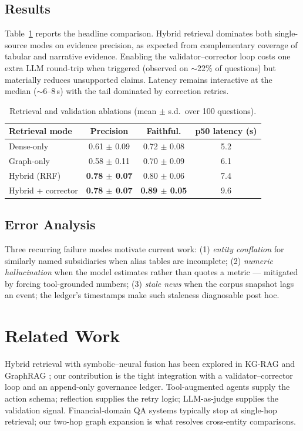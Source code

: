 \documentclass[conference]{IEEEtran}
\begin{document}
\subsection{Results}
Table~\ref{tab:results} reports the headline comparison. Hybrid retrieval dominates both single-source modes on evidence precision, as expected from complementary coverage of tabular and narrative evidence. Enabling the validator--corrector loop costs one extra LLM round-trip when triggered (observed on $\sim$22\% of questions) but materially reduces unsupported claims. Latency remains interactive at the median ($\sim$6--8\,s) with the tail dominated by correction retries.

\begin{table}[t]
\centering
\caption{Retrieval and validation ablations (mean $\pm$ s.d.\ over 100 questions).}
\label{tab:results}
\begin{tabular}{lccc}
\toprule
Retrieval mode & Precision & Faithful. & p50 latency (s) \\
\midrule
Dense-only        & 0.61 $\pm$ 0.09 & 0.72 $\pm$ 0.08 & 5.2 \\
Graph-only        & 0.58 $\pm$ 0.11 & 0.70 $\pm$ 0.09 & 6.1 \\
Hybrid (RRF)      & \textbf{0.78 $\pm$ 0.07} & 0.80 $\pm$ 0.06 & 7.4 \\
Hybrid + corrector & \textbf{0.78 $\pm$ 0.07} & \textbf{0.89 $\pm$ 0.05} & 9.6 \\
\bottomrule
\end{tabular}
\end{table}

\subsection{Error Analysis}
Three recurring failure modes motivate current work: (1) \emph{entity conflation} for similarly named subsidiaries when alias tables are incomplete; (2) \emph{numeric hallucination} when the model estimates rather than quotes a metric --- mitigated by forcing tool-grounded numbers; (3) \emph{stale news} when the corpus snapshot lags an event; the ledger's timestamps make such staleness diagnosable post hoc.

\section{Related Work}
Hybrid retrieval with symbolic--neural fusion has been explored in KG-RAG \cite{luo2024kgrag} and GraphRAG \cite{edge2024graphrag}; our contribution is the tight integration with a validator--corrector loop and an append-only governance ledger. Tool-augmented agents \cite{yao2023react,schick2023toolformer} supply the action schema; reflection \cite{shinn2023reflexion} supplies the retry logic; LLM-as-judge \cite{zheng2023judge} supplies the validation signal. Financial-domain QA systems \cite{wu2023fin} typically stop at single-hop retrieval; our two-hop graph expansion is what resolves cross-entity comparisons.
\end{document}
